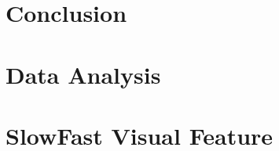 \documentclass[11pt,a4paper]{article}
\begin{document}
\section{Conclusion}


\newpage



\clearpage

\begin{appendices}


\section{Data Analysis}
\label{appendix:A}


\section{SlowFast Visual Feature} 
\label{section:visual-feature-analysis}


\end{appendices}
\end{document}
